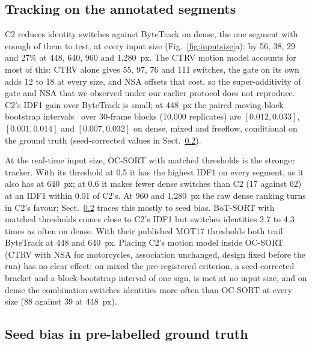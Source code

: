\documentclass[twocolumn]{svjour3}
\begin{document}
\subsection{Tracking on the annotated segments}\label{subsec:ablation}



C2 reduces identity switches against ByteTrack on dense, the one segment with
enough of them to test, at every input size (Fig.~\ref{fig:inputsize}a): by 56, 38, 29 and 27\% at 448,
640, 960 and 1,280~px. The
CTRV motion model accounts for most of this: CTRV alone gives 55, 97, 76 and
111 switches, the gate on its own adds 12 to 18 at every size, and NSA offsets
that cost, so the super-additivity of gate and NSA that we observed under our
earlier protocol does not reproduce. C2's IDF1 gain over ByteTrack is small; at
448~px the paired moving-block bootstrap intervals~\cite{Kunsch1989_bootstrap}
over 30-frame blocks (10,000 replicates) are $[0.012, 0.033]$,
$[0.001, 0.014]$ and $[0.007, 0.032]$ on dense, mixed and freeflow,
conditional on the ground truth (seed-corrected values in
Sect.~\ref{subsec:seedbias}).

At the real-time input size, OC-SORT with matched thresholds is the stronger
tracker. With its threshold at 0.5 it has the highest IDF1 on every segment,
as it also has at 640~px; at 0.6 it makes fewer dense switches than C2 (17 against 62) at an IDF1
within 0.01 of C2's. At 960 and 1,280~px the raw dense ranking turns in C2's
favour; Sect.~\ref{subsec:seedbias} traces this mostly to seed bias. BoT-SORT
with matched thresholds comes close to C2's IDF1 but switches identities 2.7 to
4.3 times as often on dense. With their published MOT17 thresholds both trail
ByteTrack at 448 and 640~px. Placing C2's motion model inside OC-SORT (CTRV
with NSA for motorcycles, association unchanged, design fixed before the run)
has no clear effect: on mixed the pre-registered criterion, a seed-corrected
bracket and a block-bootstrap interval of one sign, is met at no input size, and
on dense the combination switches identities more often than OC-SORT at every
size (88 against 39 at 448~px).



\subsection{Seed bias in pre-labelled ground truth}\label{subsec:seedbias}
\end{document}
